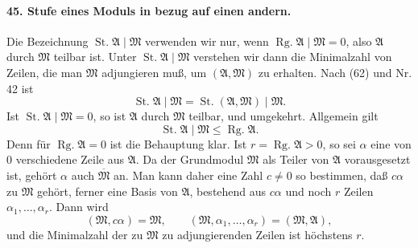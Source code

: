 \documentclass[11pt]{article}
\newcommand{\Rg}{\operatorname{Rg.}}
\newcommand{\St}{\operatorname{St.}}
\begin{document}
\paragraph{45. Stufe eines Moduls in bezug auf einen andern.}
Die Bezeichnung $\St\mathfrak A\mid\mathfrak M$ verwenden wir nur, wenn $\Rg\mathfrak A\mid\mathfrak M=0$, also $\mathfrak A$ durch $\mathfrak M$ teilbar ist. Unter $\St\mathfrak A\mid\mathfrak M$ verstehen wir dann die Minimalzahl von Zeilen, die man $\mathfrak M$ adjungieren muß, um $(\mathfrak A,
\mathfrak M)$ zu erhalten. Nach (62) und Nr. 42 ist
\begin{equation}
\St\mathfrak A\mid\mathfrak M=\St(\mathfrak A,
\mathfrak M)\mid\mathfrak M.
\tag{74}
\end{equation}
Ist $\St\mathfrak A\mid\mathfrak M=0$, so ist $\mathfrak A$ durch $\mathfrak M$ teilbar, und umgekehrt. Allgemein gilt
\begin{equation}
\St\mathfrak A\mid\mathfrak M\le \Rg\mathfrak A.
\tag{75}
\end{equation}
Denn für $\Rg\mathfrak A=0$ ist die Behauptung klar. Ist $r=\Rg\mathfrak A>0$, so sei $\alpha$ eine von $0$ verschiedene Zeile aus $\mathfrak A$. Da der Grundmodul $\mathfrak M$ als Teiler von $\mathfrak A$ vorausgesetzt ist, gehört $\alpha$ auch $\overline{\mathfrak M}$ an. Man kann daher eine Zahl $c\ne0$ so bestimmen, daß $c\alpha$ zu $\mathfrak M$ gehört, ferner eine Basis von $\mathfrak A$, bestehend aus $c\alpha$ und noch $r$ Zeilen $\alpha_1,
\ldots,
\alpha_r$. Dann wird
\[
(\mathfrak M,
 c\alpha) =\mathfrak M,
\qquad
(\mathfrak M,
\alpha_1,
\ldots,
\alpha_r)= (\mathfrak M,
\mathfrak A),
\]
und die Minimalzahl der zu $\mathfrak M$ zu adjungierenden Zeilen ist höchstens $r$.
\end{document}
